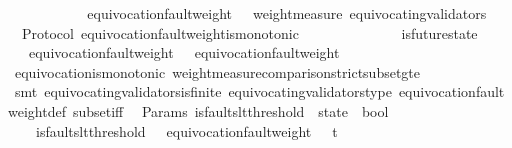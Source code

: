 \begin{isabellebody}
\ \ \isanewline
\ \ \ \ \isanewline
\ \ \ \ {\isachardoublequoteopen}equivocation{\isacharunderscore}fault{\isacharunderscore}weight\ {\isasymsigma}\ {\isacharequal}\ weight{\isacharunderscore}measure\ {\isacharparenleft}equivocating{\isacharunderscore}validators\ {\isasymsigma}{\isacharparenright}{\isachardoublequoteclose}\isanewline
\isanewline
{}\isamarkupfalse%
\ {\isacharparenleft}\ Protocol{\isacharparenright}\ equivocation{\isacharunderscore}fault{\isacharunderscore}weight{\isacharunderscore}is{\isacharunderscore}monotonic\ {\isacharcolon}\isanewline
\ \ {\isachardoublequoteopen}{\isasymforall}\ {\isasymsigma}\ {\isasymsigma}{\isacharprime}{\isachardot}\ {\isasymsigma}\ {\isasymin}\ {\isasymSigma}\ {\isasymand}\ {\isasymsigma}{\isacharprime}\ {\isasymin}\ {\isasymSigma}\ {\isasymand}\ is{\isacharunderscore}future{\isacharunderscore}state\ {\isacharparenleft}{\isasymsigma}{\isacharcomma}\ {\isasymsigma}{\isacharprime}{\isacharparenright}\isanewline
\ \ {\isasymlongrightarrow}\ equivocation{\isacharunderscore}fault{\isacharunderscore}weight\ {\isasymsigma}\ {\isasymle}\ equivocation{\isacharunderscore}fault{\isacharunderscore}weight\ {\isasymsigma}{\isacharprime}{\isachardoublequoteclose}\isanewline
%
\isadelimproof
\ \ %
\endisadelimproof
%
\isatagproof
{}\isamarkupfalse%
\ equivocation{\isacharunderscore}is{\isacharunderscore}monotonic\ weight{\isacharunderscore}measure{\isacharunderscore}comparison{\isacharunderscore}strict{\isacharunderscore}subset{\isacharunderscore}gte\ \isanewline
\ \ \isamarkupfalse%
\ {\isacharparenleft}smt\ equivocating{\isacharunderscore}validators{\isacharunderscore}is{\isacharunderscore}finite\ equivocating{\isacharunderscore}validators{\isacharunderscore}type\ equivocation{\isacharunderscore}fault{\isacharunderscore}weight{\isacharunderscore}def\ subset{\isacharunderscore}iff{\isacharparenright}%
\endisatagproof
{\isafoldproof}%
%
\isadelimproof
\isanewline
%
\endisadelimproof
\isanewline
\isanewline
{}\isamarkupfalse%
\ {\isacharparenleft}\ Params{\isacharparenright}\ is{\isacharunderscore}faults{\isacharunderscore}lt{\isacharunderscore}threshold\ {\isacharcolon}{\isacharcolon}\ {\isachardoublequoteopen}state\ {\isasymRightarrow}\ bool{\isachardoublequoteclose}\isanewline
\ \ \ \isanewline
\ \ \ \ {\isachardoublequoteopen}is{\isacharunderscore}faults{\isacharunderscore}lt{\isacharunderscore}threshold\ {\isasymsigma}\ {\isacharequal}\ {\isacharparenleft}equivocation{\isacharunderscore}fault{\isacharunderscore}weight\ {\isasymsigma}\ {\isacharless}\ t{\isacharparenright}{\isachardoublequoteclose}\isanewline

\end{isabellebody}
